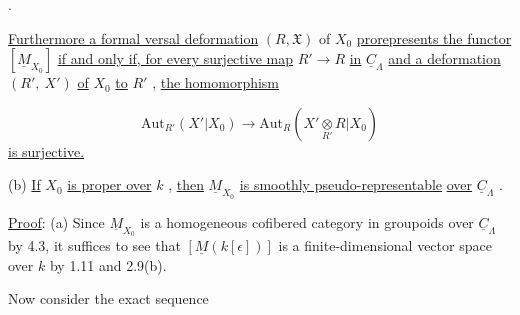 \begin{center}
\quad .
\end{center}
\underline{Furthermore a formal versal deformation}  $(R,\mathfrak{X})$  of  $X_{0}$  \underline{prorepresents the functor} $[\underline{M}_{X_{0}}]$  \underline{if and only if, for every surjective map}  $R' \to R$  \underline{in}  $\underline{C}_{\Lambda}$  \underline{and a deformation} $(R',\ X')$  \underline{of}  $X_{0}$  \underline{to}  $R'$ , \underline{the homomorphism}

\begin{equation*}
\mathrm{Aut}_{R'}(X'|X_{0}) \to \mathrm{Aut}_{R}(X' \underset{R'}{\otimes} R|X_{0})
\end{equation*}
\underline{is surjective.}

(b)  \underline{If}  $X_{0}$  \underline{is proper over}  $k$ , \underline{then}  $\underline{M}_{X_{0}}$  \underline{is smoothly pseudo-representable}
\underline{over} $\underline{C}_{\Lambda}$ .

\underline{Proof}:  (a)  Since  $\underline{M}_{X_{0}}$  is a homogeneous cofibered category in groupoids over $\underline{C}_{\Lambda}$ by 4.3, it suffices to see that  $[\underline{M}(k[\epsilon])]$  is a finite-dimensional vector space over  $k$  by 1.11 and 2.9(b).

Now consider the exact sequence

